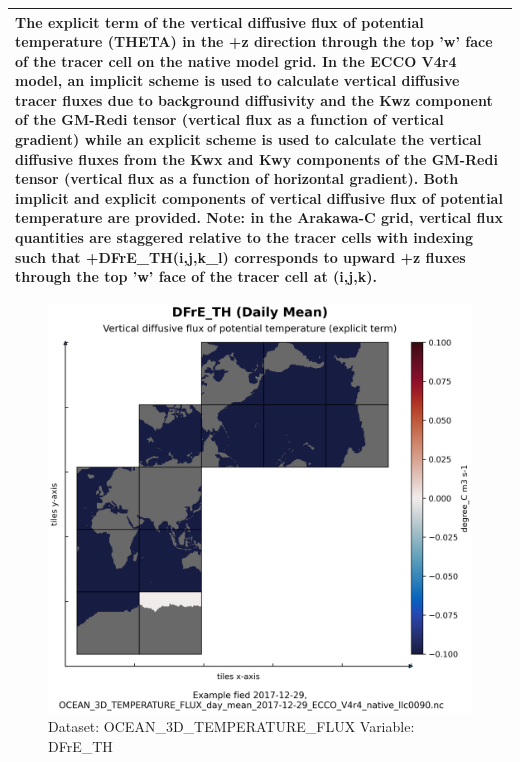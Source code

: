 \begin{longtable}{|m{}|m{}|m{}|m{}|}
\multicolumn{4}{|p{1\textwidth}|}{The explicit term of the vertical diffusive flux of potential temperature (THETA) in the +z direction through the top 'w' face of the tracer cell on the native model grid. In the ECCO V4r4 model, an implicit scheme is used to calculate vertical diffusive tracer fluxes due to background diffusivity and the Kwz component of the GM-Redi tensor (vertical flux as a function of vertical gradient) while an explicit scheme is used to calculate the vertical diffusive fluxes from the Kwx and Kwy components of the GM-Redi tensor (vertical flux as a function of horizontal gradient). Both implicit and explicit components of vertical diffusive flux of potential temperature are provided. Note: in the Arakawa-C grid, vertical flux quantities are staggered relative to the tracer cells with indexing such that +DFrE\_TH(i,j,k\_l) corresponds to upward +z fluxes through the top 'w' face of the tracer cell at (i,j,k).} \\ \hline
\end{longtable}

\begin{figure}[H]
\centering
\includegraphics[scale=0.55]{../images/plots/native_plots/Ocean_Three-Dimensional_Potential_Temperature_Fluxes/DFrE_TH.png}
\caption{Dataset: OCEAN\_3D\_TEMPERATURE\_FLUX Variable: DFrE\_TH}
\label{tab:table-OCEAN_3D_TEMPERATURE_FLUX_DFrE_TH-Plot}
\end{figure}
\pagebreak
